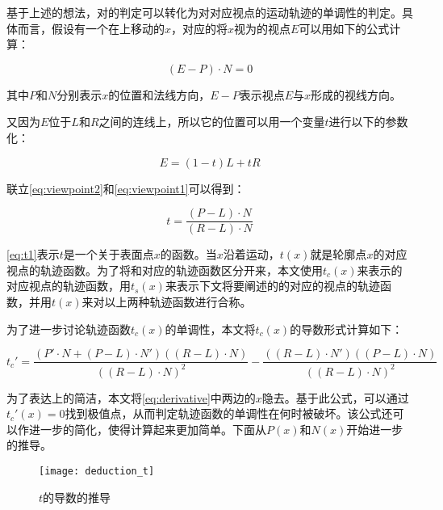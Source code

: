 基于上述的想法，对\epsl{}的判定可以转化为对对应视点的运动轨迹的单调性的判定。具体而言，假设有一个在\ec{}上移动的\conp{}$x$，对应的将$x$视为\conp{}的视点$E$可以用如下的公式计算：

\begin{equation}\label{eq:viewpoint2}
    {(E - P)}\cdot{N} = 0
\end{equation}

其中$P$和$N$分别表示\conp{}$x$的位置和法线方向，$E - P$表示视点$E$与$x$形成的视线方向。

又因为$E$位于$L$和$R$之间的连线上，所以它的位置可以用一个变量$t$进行以下的参数化：

\begin{equation}\label{eq:viewpoint1}
    E = (1-t)L+t R
\end{equation}

联立\autoref{eq:viewpoint2}和\autoref{eq:viewpoint1}可以得到：

\begin{equation}\label{eq:t1}
t = \frac{(P-L)\cdot{N}}{(R-L)\cdot{N}}
\end{equation}

\autoref{eq:t1}表示$t$是一个关于表面点$x$的函数。当$x$沿着\ec{}运动，$t(x)$就是轮廓点$x$的对应视点的轨迹函数。为了将\con{}和\scon{}对应的轨迹函数区分开来，本文使用$t_c(x)$来表示\conp{}的对应视点的轨迹函数，用$t_s(x)$来表示下文将要阐述的\sconp{}的对应的视点的轨迹函数，并用$t(x)$来对以上两种轨迹函数进行合称。

为了进一步讨论轨迹函数$t_c(x)$的单调性，本文将$t_c(x)$的导数形式计算如下：

\begin{equation}\label{eq:derivative}
  t_c' = \frac{(P'\cdot{N}+(P-L)\cdot{N'})((R-L)\cdot{N})}{((R-L)\cdot{N})^2}-\frac{((R-L)\cdot{N'})((P-L)\cdot{N})}{((R-L)\cdot{N})^2}
\end{equation}

为了表达上的简洁，本文将\autoref{eq:derivative}中两边的$x$隐去。基于此公式，可以通过$t_c'(x)=0$找到极值点，从而判定轨迹函数的单调性在何时被破坏。该公式还可以作进一步的简化，使得计算起来更加简单。下面从$P(x)$和$N(x)$开始进一步的推导。

\begin{figure}[bth]
    \centering
    \texttt{[image: deduction\_t]}
    \caption{\label{fig:deduction_t}
    $t$的导数的推导}
\end{figure}  


